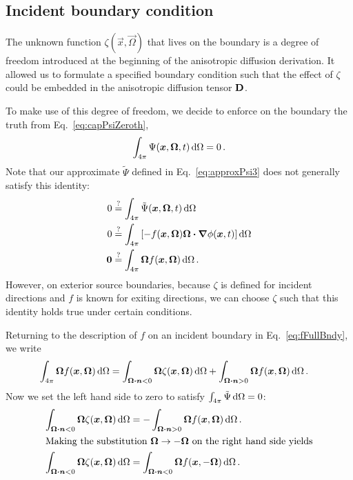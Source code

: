 \subsection{Incident boundary condition}\label{sec:zeta}

The unknown function $\zeta(\vec{x}, \vec{\Omega})$ that lives on the boundary
is a degree of freedom introduced at the beginning of the anisotropic
diffusion derivation. It allowed us to formulate a specified boundary condition
such that the effect of $\zeta$ could be embedded in the anisotropic diffusion
tensor $\mathbf{D}$.

To make use of this degree of freedom, we decide to enforce on the boundary the
truth from Eq.~\eqref{eq:capPsiZeroth},
\begin{equation*}
  \int_{4\pi} \Psi(\bm{x}, \bm{\Omega}, t) \mathop{}\!\mathrm{d}\Omega
  = 0 \,.
\end{equation*}
Note that our approximate $\tilde\Psi$ defined in Eq.~\eqref{eq:approxPsi3}
does not generally satisfy this identity:
\begin{align*}
  0
&\stackrel{\mathrm{?}}{=} \int_{4\pi} \tilde\Psi(\bm{x}, \bm{\Omega}, t) \mathop{}\!\mathrm{d}\Omega
\\
0 &\stackrel{\mathrm{?}}{=} \int_{4\pi} \left[ - f(\bm{x}, \bm{\Omega}) \bm{\Omega}
\bm{\cdot} \bm{\nabla} \phi(\bm{x}, t)\right]
\mathop{}\!\mathrm{d}\Omega
\\
\bm{0} &\stackrel{\mathrm{?}}{=} \int_{4\pi} \bm{\Omega} f(\bm{x}, \bm{\Omega})\mathop{}\!\mathrm{d}\Omega \,.
\end{align*}
However, on exterior source boundaries, because $\zeta$ is defined for incident
directions and $f$ is known for exiting directions, we can choose $\zeta$ such
that this identity holds true under certain conditions.

Returning to the description of $f$ on an incident boundary in
Eq.~\eqref{eq:fFullBndy}, we write
\begin{align*}
  \int_{4\pi} \bm{\Omega} f(\bm{x}, \bm{\Omega})\mathop{}\!\mathrm{d}\Omega
  &= \int_{\bm{\Omega} \bm{\cdot} \bm{n} < 0}
  \bm{\Omega} \zeta(\bm{x}, \bm{\Omega})\mathop{}\!\mathrm{d}\Omega
  + \int_{\bm{\Omega} \bm{\cdot} \bm{n} > 0}
  \bm{\Omega} f(\bm{x}, \bm{\Omega})\mathop{}\!\mathrm{d}\Omega\,.
\end{align*}
Now we set the left hand side to zero to satisfy $\int_{4\pi} \tilde\Psi \mathop{}\!\mathrm{d}\Omega = 0$:
\begin{align}
  \label{eq:zetaCondition1}
  \int_{\bm{\Omega} \bm{\cdot} \bm{n} < 0}
  \bm{\Omega} \zeta(\bm{x}, \bm{\Omega})\mathop{}\!\mathrm{d}\Omega
  &= -\int_{\bm{\Omega} \bm{\cdot} \bm{n} > 0}
  \bm{\Omega} f(\bm{x}, \bm{\Omega})\mathop{}\!\mathrm{d}\Omega \,.
  \\ 
  \intertext{Making the substitution $\bm{\Omega}\to -\bm{\Omega}$ on the
  right hand side yields}
  \label{eq:zetaCondition2}
  \int_{\bm{\Omega} \bm{\cdot} \bm{n} < 0}
  \bm{\Omega} \zeta(\bm{x}, \bm{\Omega})\mathop{}\!\mathrm{d}\Omega
  &= \int_{\bm{\Omega} \bm{\cdot} \bm{n} < 0}
  \bm{\Omega} f(\bm{x}, -\bm{\Omega})\mathop{}\!\mathrm{d}\Omega \,.
\end{align}

